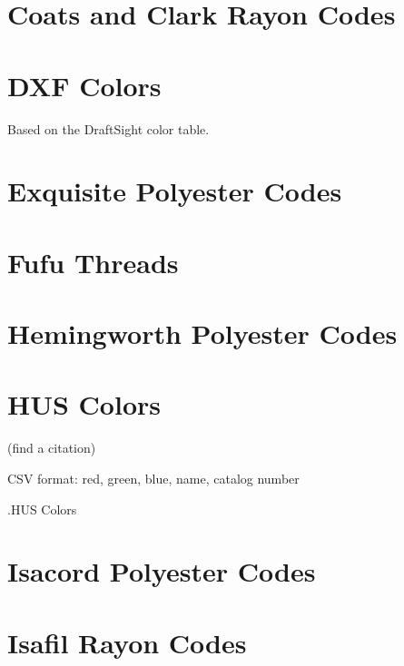 \documentclass[11pt]{report}
\begin{document}
\section{Coats and Clark Rayon Codes}

%

\section{DXF Colors}

Based on the DraftSight color table.

%

\section{Exquisite Polyester Codes}

%

\section{Fufu Threads}

%

%

\section{Hemingworth Polyester Codes}

%

\section{HUS Colors}

(find a citation)

CSV format: red, green, blue, name, catalog number

.HUS Colors

%

\section{Isacord Polyester Codes}

%

\section{Isafil Rayon Codes}
\end{document}
